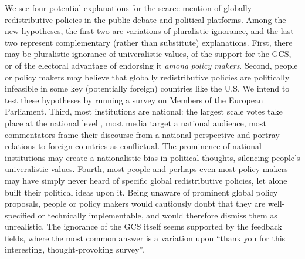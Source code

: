 We see four potential explanations for the scarce mention of globally redistributive policies in the public debate and political platforms. Among the new hypotheses, the first two are variations of pluralistic ignorance, and the last two represent complementary (rather than substitute) explanations. First, there may be pluralistic ignorance of univeralistic values, of the support for the GCS, or of the electoral advantage of endorsing it \textit{among policy makers}. Second, people or policy makers may believe that globally redistributive policies are politically infeasible in some key (potentially foreign) countries like the U.S.  We intend to test these hypotheses by running a survey on %
Members of the European Parliament. 
Third, most institutions are national: the largest scale votes take place at the national level%
, most media target a national audience, most commentators frame their discourse from a national perspective and portray relations to foreign countries as conflictual. The prominence of national institutions may create a nationalistic bias in political thoughts, silencing people's univeralistic values. 
Fourth, most people and perhaps even most policy makers may have simply never heard of specific global redistributive policies, %
let alone built their political ideas upon it. Being unaware of prominent global policy proposals, people or policy makers would cautiously doubt that they are well-specified or technically implementable, and would therefore dismiss them as unrealistic. %
The ignorance of the GCS itself seems supported by the feedback fields, where the most common answer is a variation upon ``thank you for this interesting, thought-provoking survey''. %

